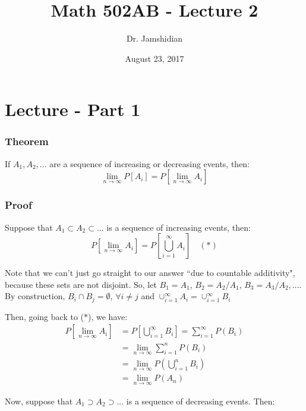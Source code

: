 \documentclass{article}
\title{Math 502AB - Lecture 2}
\author{Dr. Jamshidian}
\date{August 23, 2017}
\begin{document}
\maketitle

\section{Lecture - Part 1}

\subsubsection*{Theorem}

If $A_1, A_2, ...$ are a sequence of increasing or decreasing events, then:
\begin{equation*}
    \lim_{n\to\infty} P[A_i] = P\left[\lim_{n\to\infty} A_i \right]
\end{equation*}

\subsubsection*{Proof}

Suppose that $A_1 \subset A_2 \subset ...$ is a sequence of increasing events, then:
\begin{equation*}
    P\left[\lim_{n\to\infty} A_i \right] = P\left[\bigcup_{i=1}^\infty A_i \right] \quad (*)
\end{equation*}

Note that we can't just go straight to our answer ``due to countable additivity", because these sets are not disjoint. So, let $B_1=A_1$, $B_2 = A_2/A_1$, $B_3 = A_3/A_2,...$. By construction, $B_i \cap B_j = \emptyset$, $\forall i\neq j$ and $\cup_{i=1}^\infty A_i = \cup_{i=1}^\infty B_i$

Then, going back to ($*$), we have:
\begin{equation*}
    \begin{split}
        P\left[\lim_{n\to\infty} A_i \right] &= P\left[\bigcup_{i=1}^\infty B_i \right] = \sum_{i=1}^\infty P(B_i)\\
        &= \lim_{n\to\infty} \sum_{i=1}^n P(B_i)\\
        &= \lim_{n\to\infty} P\left(\bigcup_{i=1}^n B_i \right)\\
        &= \lim_{n\to\infty} P(A_n)
    \end{split}
\end{equation*}

Now, suppose that $A_1 \supset A_2 \supset ...$ is a sequence of decreasing events. Then:
\end{document}
